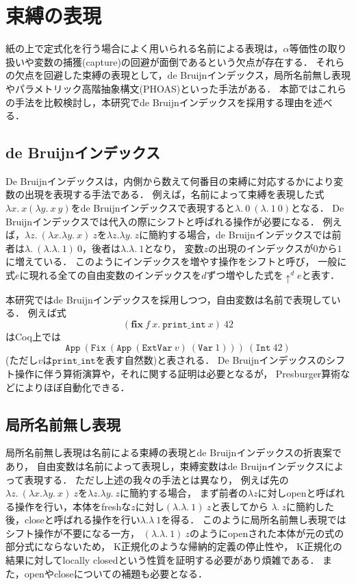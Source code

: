 \documentclass[T]{compsoft}
\newcommand{\keyword}[1]{\mathbf{#1}}
\newcommand{\FIX}{\keyword{fix}}
\begin{document}
\section{束縛の表現}\label{section:bindings}
紙の上で定式化を行う場合によく用いられる名前による表現は，$\alpha$等価性の取り扱いや変数の捕獲(capture)の回避が面倒であるという欠点が存在する．
それらの欠点を回避した束縛の表現として，de Bruijnインデックス\cite{Pierce:TypeSystems}，局所名前無し表現\cite{chargueraud-11-ln}やパラメトリック高階抽象構文(PHOAS)\cite{Chlipala:2008:PHA:1411204.1411226}といった手法がある．
本節ではこれらの手法を比較検討し，本研究でde Bruijnインデックスを採用する理由を述べる．

\subsection{de Bruijnインデックス}
De Bruijnインデックスは，内側から数えて何番目の束縛に対応するかにより変数の出現を表現する手法である．
例えば，名前によって束縛を表現した式$\lambda x.~x (\lambda y.~x~y)$をde Bruijnインデックスで表現すると$\lambda.~0~(\lambda.~1~0)$となる．
De Bruijnインデックスでは代入の際にシフトと呼ばれる操作が必要になる．
例えば，$\lambda z.~(\lambda x.\lambda y.~x)~z$を$\lambda z.\lambda y.~z$に簡約する場合，de Bruijnインデックスでは前者は$\lambda.~(\lambda.\lambda.~1)~0$，後者は$\lambda.\lambda.~1$となり，
変数$z$の出現のインデックスが$0$から$1$に増えている．
このようにインデックスを増やす操作をシフトと呼び，
一般に式$e$に現れる全ての自由変数のインデックスを$d$ずつ増やした式を$\uparrow^d e$と表す．

本研究ではde Bruijnインデックスを採用しつつ，自由変数は名前で表現している．
例えば式
\[(\FIX~f~x.~\texttt{print\_int}~x)~42\]
はCoq上では
\[\texttt{App}~(\texttt{Fix}~(\texttt{App}~(\texttt{ExtVar}~v)~(\texttt{Var}~1)))~(\texttt{Int}~42)\]
(ただし$v$は$\texttt{print\_int}$を表す自然数)と表される．
De Bruijnインデックスのシフト操作に伴う算術演算や，それに関する証明は必要となるが，
Presburger算術などによりほぼ自動化できる．

\subsection{局所名前無し表現}
局所名前無し表現\cite{chargueraud-11-ln}は名前による束縛の表現とde Bruijnインデックスの折衷案であり，
自由変数は名前によって表現し，束縛変数はde Bruijnインデックスによって表現する．
ただし上述の我々の手法とは異なり，
例えば先の$\lambda z.~(\lambda x.\lambda y.~x)~z$を$\lambda z.\lambda y.~z$に簡約する場合，
まず前者の$\lambda z$に対しopenと呼ばれる操作を行い，本体をfreshな$z$に対し$(\lambda .\lambda.~1)~z$と表してから
$\lambda.~z$に簡約した後，closeと呼ばれる操作を行い$\lambda.\lambda~1$を得る．
このように局所名前無し表現ではシフト操作が不要になる一方，
$(\lambda .\lambda.~1)~z$のようにopenされた本体が元の式の部分式にならないため，
K正規化のような帰納的定義の停止性や，
K正規化の結果に対してlocally closedという性質を証明する必要があり煩雑である．
また，openやcloseについての補題も必要となる．
\end{document}
